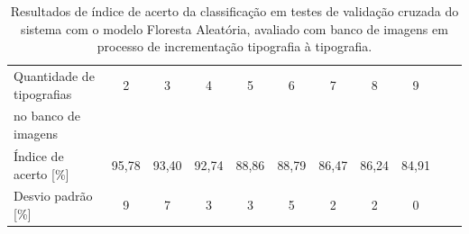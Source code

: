 
\begin{table}[H]
 \centering
 \begin{tabular}{l|c|c|c|c|c|c|c|c|c|c}
    Quantidade de tipografias  & 2 & 3 & 4 & 5 & 6 & 7 & 8 & 9\\ no banco de imagens & & & & & & & & \\
	\hline
	Índice de acerto [\%] & 95,78 & 93,40 & 92,74 & 88,86 & 88,79 & 86,47 & 86,24 & 84,91 \\
	Desvio padrão [\%] & 9 & 7 & 3 & 3 & 5 & 2 & 2 & 0\\
 \end{tabular}
 \caption{Resultados de índice de acerto da classificação em testes de validação cruzada do sistema com o modelo Floresta Aleatória, avaliado com banco de imagens em processo de incrementação tipografia à tipografia.}
 \label{tab:rfcResults}
\end{table}


